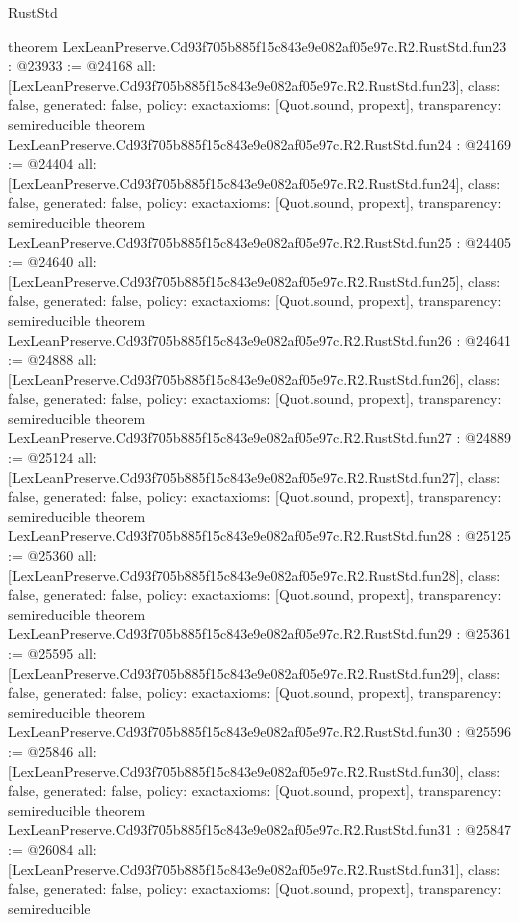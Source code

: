 \begin{lexlean}{RustStd}
\begin{coremodule}
{}
theorem LexLeanPreserve.Cd93f705b885f15c843e9e082af05e97c.R2.RustStd.fun23 : @23933 := @24168 {
  all: [LexLeanPreserve.Cd93f705b885f15c843e9e082af05e97c.R2.RustStd.fun23],
  class: false,
  generated: false,
  policy: exact{axioms: [Quot.sound, propext]},
  transparency: semireducible
}
theorem LexLeanPreserve.Cd93f705b885f15c843e9e082af05e97c.R2.RustStd.fun24 : @24169 := @24404 {
  all: [LexLeanPreserve.Cd93f705b885f15c843e9e082af05e97c.R2.RustStd.fun24],
  class: false,
  generated: false,
  policy: exact{axioms: [Quot.sound, propext]},
  transparency: semireducible
}
theorem LexLeanPreserve.Cd93f705b885f15c843e9e082af05e97c.R2.RustStd.fun25 : @24405 := @24640 {
  all: [LexLeanPreserve.Cd93f705b885f15c843e9e082af05e97c.R2.RustStd.fun25],
  class: false,
  generated: false,
  policy: exact{axioms: [Quot.sound, propext]},
  transparency: semireducible
}
theorem LexLeanPreserve.Cd93f705b885f15c843e9e082af05e97c.R2.RustStd.fun26 : @24641 := @24888 {
  all: [LexLeanPreserve.Cd93f705b885f15c843e9e082af05e97c.R2.RustStd.fun26],
  class: false,
  generated: false,
  policy: exact{axioms: [Quot.sound, propext]},
  transparency: semireducible
}
theorem LexLeanPreserve.Cd93f705b885f15c843e9e082af05e97c.R2.RustStd.fun27 : @24889 := @25124 {
  all: [LexLeanPreserve.Cd93f705b885f15c843e9e082af05e97c.R2.RustStd.fun27],
  class: false,
  generated: false,
  policy: exact{axioms: [Quot.sound, propext]},
  transparency: semireducible
}
theorem LexLeanPreserve.Cd93f705b885f15c843e9e082af05e97c.R2.RustStd.fun28 : @25125 := @25360 {
  all: [LexLeanPreserve.Cd93f705b885f15c843e9e082af05e97c.R2.RustStd.fun28],
  class: false,
  generated: false,
  policy: exact{axioms: [Quot.sound, propext]},
  transparency: semireducible
}
theorem LexLeanPreserve.Cd93f705b885f15c843e9e082af05e97c.R2.RustStd.fun29 : @25361 := @25595 {
  all: [LexLeanPreserve.Cd93f705b885f15c843e9e082af05e97c.R2.RustStd.fun29],
  class: false,
  generated: false,
  policy: exact{axioms: [Quot.sound, propext]},
  transparency: semireducible
}
theorem LexLeanPreserve.Cd93f705b885f15c843e9e082af05e97c.R2.RustStd.fun30 : @25596 := @25846 {
  all: [LexLeanPreserve.Cd93f705b885f15c843e9e082af05e97c.R2.RustStd.fun30],
  class: false,
  generated: false,
  policy: exact{axioms: [Quot.sound, propext]},
  transparency: semireducible
}
theorem LexLeanPreserve.Cd93f705b885f15c843e9e082af05e97c.R2.RustStd.fun31 : @25847 := @26084 {
  all: [LexLeanPreserve.Cd93f705b885f15c843e9e082af05e97c.R2.RustStd.fun31],
  class: false,
  generated: false,
  policy: exact{axioms: [Quot.sound, propext]},
  transparency: semireducible
}
\end{coremodule}
\end{lexlean}
